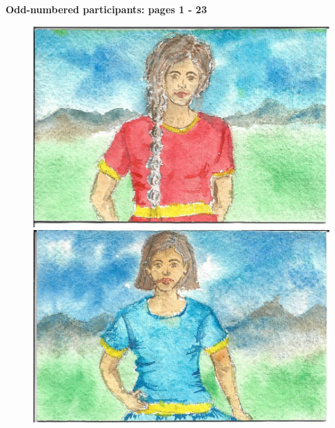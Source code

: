 \documentclass[12pt]{article}
\begin{document}

\thispagestyle{empty}

\vspace*{\fill}
\begingroup
\centering

{\bf \Huge Odd-numbered participants: pages 1 - 23}

\endgroup
\vspace*{\fill}

\newpage

\setcounter{page}{1}

\begin{figure}[h!]
\centering
\includegraphics[width=.38\paperwidth]{pictures/A}

\vspace*{1cm}

\includegraphics[width=.38\paperwidth]{pictures/L}
\end{figure}
\end{document}
